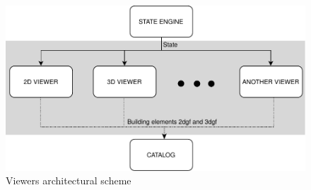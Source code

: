 \begin{figure}[htb]
\centering
\includegraphics[width=\linewidth]{contents/images/diagramma-visualizzatori}
\caption{Viewers architectural scheme}
\label{fig_viewers}
\end{figure}

